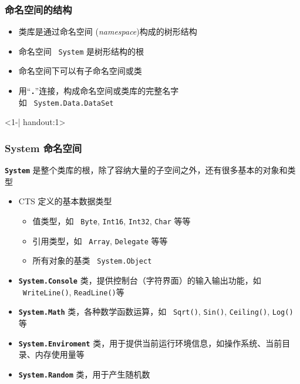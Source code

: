 \begin{frame}
\frametitle{命名空间的结构}

\begin{itemize}
\item<1-| handout:1> 类库是通过{命名空间} (\textit{namespace})构成的树形结构
\item<2-| handout:1> 命名空间 ~\texttt{System} 是树形结构的根
\item<3-| handout:1> 命名空间下可以有{\color<handout:0>{red!60!black}子命名空间}或{类}
\item<4-| handout:1> 用``\textbf{\texttt{.}}''连接，构成命名空间或类库的完整名字 \\ 如 ~\texttt{System.Data.DataSet}
\end{itemize}

\begin{onlyenv}<1-| handout:1>
  \begin{figure}[h] \label<1| handout:1>{fig:fcl-namespaces} \centering
    
  \end{figure}
\end{onlyenv}
\end{frame}

\begin{frame}
\frametitle{System 命名空间}

\CJKindent \texttt{\textbf{System}} 是整个类库的根，除了容纳大量的子空间之外，还有很多基本的对象和类型
\pause
\begin{itemize}
\item CTS 定义的基本数据类型
  \begin{itemize}
  \item 值类型，如 ~\texttt{Byte}, \texttt{Int16}, \texttt{Int32}, \texttt{Char} 等等
  \item 引用类型，如 ~\texttt{Array}, \texttt{Delegate} 等等
  \item 所有对象的基类 ~\texttt{System.Object}
  \end{itemize}
\pause
\item \texttt{\textbf{System.Console}} 类，提供控制台（字符界面）的输入输出功能，如 ~\texttt{WriteLine()},
  \texttt{ReadLine()}等
\pause
\item \texttt{\textbf{System.Math}} 类，各种数学函数运算，如 ~\texttt{Sqrt()}, \texttt{Sin()}, \texttt{Ceiling()}, \texttt{Log()}等
\pause
\item \texttt{\textbf{System.Enviroment}} 类，用于提供当前运行环境信息，如操作系统、当前目录、内存使用量等
\pause
\item \texttt{\textbf{System.Random}} 类，用于产生随机数

\end{itemize}

\end{frame}

